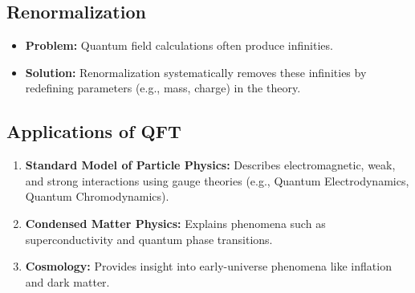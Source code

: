 %
%
%


\subsection{Renormalization}
\begin{itemize}
    \item \textbf{Problem:} Quantum field calculations often produce infinities.
    \item \textbf{Solution:} Renormalization systematically removes these infinities by redefining parameters (e.g., mass, charge) in the theory.
\end{itemize}

\subsection{Applications of QFT}
\begin{enumerate}
    \item \textbf{Standard Model of Particle Physics:} Describes electromagnetic, weak, and strong interactions using gauge theories (e.g., Quantum Electrodynamics, Quantum Chromodynamics).
    \item \textbf{Condensed Matter Physics:} Explains phenomena such as superconductivity and quantum phase transitions.
    \item \textbf{Cosmology:} Provides insight into early-universe phenomena like inflation and dark matter.
\end{enumerate}



